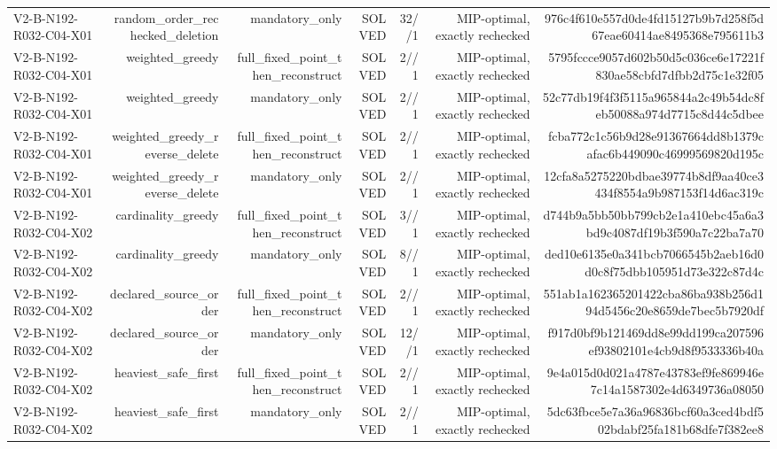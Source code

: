 {\begin{longtable}{lrrrrrr}
V2-B-N192-R032-C04-X01 & random\_order\_rechecked\_deletion & mandatory\_only & SOLVED & 32//1 & MIP-optimal, exactly rechecked & 976c4f610e557d0de4fd15127b9b7d258f5d67eae60414ae8495368e795611b3 \\
V2-B-N192-R032-C04-X01 & weighted\_greedy & full\_fixed\_point\_then\_reconstruct & SOLVED & 2//1 & MIP-optimal, exactly rechecked & 5795fccce9057d602b50d5c036ce6e17221f830ae58cbfd7dfbb2d75c1e32f05 \\
V2-B-N192-R032-C04-X01 & weighted\_greedy & mandatory\_only & SOLVED & 2//1 & MIP-optimal, exactly rechecked & 52c77db19f4f3f5115a965844a2c49b54dc8feb50088a974d7715c8d44c5dbee \\
V2-B-N192-R032-C04-X01 & weighted\_greedy\_reverse\_delete & full\_fixed\_point\_then\_reconstruct & SOLVED & 2//1 & MIP-optimal, exactly rechecked & fcba772c1c56b9d28e91367664dd8b1379cafac6b449090c46999569820d195c \\
V2-B-N192-R032-C04-X01 & weighted\_greedy\_reverse\_delete & mandatory\_only & SOLVED & 2//1 & MIP-optimal, exactly rechecked & 12cfa8a5275220bdbae39774b8df9aa40ce3434f8554a9b987153f14d6ac319c \\
V2-B-N192-R032-C04-X02 & cardinality\_greedy & full\_fixed\_point\_then\_reconstruct & SOLVED & 3//1 & MIP-optimal, exactly rechecked & d744b9a5bb50bb799cb2e1a410ebc45a6a3bd9c4087df19b3f590a7c22ba7a70 \\
V2-B-N192-R032-C04-X02 & cardinality\_greedy & mandatory\_only & SOLVED & 8//1 & MIP-optimal, exactly rechecked & ded10e6135e0a341bcb7066545b2aeb16d0d0c8f75dbb105951d73e322c87d4c \\
V2-B-N192-R032-C04-X02 & declared\_source\_order & full\_fixed\_point\_then\_reconstruct & SOLVED & 2//1 & MIP-optimal, exactly rechecked & 551ab1a162365201422cba86ba938b256d194d5456c20e8659de7bec5b7920df \\
V2-B-N192-R032-C04-X02 & declared\_source\_order & mandatory\_only & SOLVED & 12//1 & MIP-optimal, exactly rechecked & f917d0bf9b121469dd8e99dd199ca207596ef93802101e4cb9d8f9533336b40a \\
V2-B-N192-R032-C04-X02 & heaviest\_safe\_first & full\_fixed\_point\_then\_reconstruct & SOLVED & 2//1 & MIP-optimal, exactly rechecked & 9e4a015d0d021a4787e43783ef9fe869946e7c14a1587302e4d6349736a08050 \\
V2-B-N192-R032-C04-X02 & heaviest\_safe\_first & mandatory\_only & SOLVED & 2//1 & MIP-optimal, exactly rechecked & 5dc63fbce5e7a36a96836bcf60a3ced4bdf502bdabf25fa181b68dfe7f382ee8 \\

\end{longtable}}
